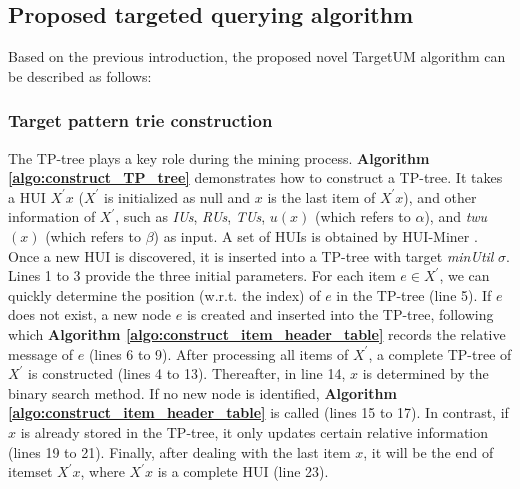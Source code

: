 \documentclass[journal]{IEEEtran}
\begin{document}
\subsection{Proposed targeted querying algorithm}

Based on the previous introduction, the proposed novel TargetUM algorithm can be described as follows:

\subsubsection{Target pattern trie construction}

The TP-tree plays a key role during the mining process. \textbf{Algorithm \ref{algo:construct_TP_tree}} demonstrates how to construct a TP-tree. It takes a HUI $X^\prime x$ ($X^\prime$ is initialized as null and $x$ is the last item of $X^\prime x$), and other information of $X^\prime$, such as \textit{IUs}, \textit{RUs}, \textit{TUs}, $u(x)$ (which refers to $\alpha$), and \textit{twu}$(x)$ (which refers to $\beta$) as input. A set of HUIs is obtained by HUI-Miner \cite{liu2012mining}. Once a new HUI is discovered, it is inserted into a TP-tree with target \textit{minUtil} $\sigma$. Lines 1 to 3 provide the three initial parameters. For each item $e \in X^\prime$, we can quickly determine the position (w.r.t. the index) of $e$ in the TP-tree (line 5). If $e$ does not exist, a new node $e$ is created and inserted into the TP-tree, following which \textbf{Algorithm \ref{algo:construct_item_header_table}} records the relative message of $e$ (lines 6 to 9). After processing all items of $X^\prime$, a complete TP-tree of $X^\prime$ is constructed (lines 4 to 13). Thereafter, in line 14, $x$ is determined by the binary search method. If no new node is identified, \textbf{Algorithm \ref{algo:construct_item_header_table}} is called (lines 15 to 17). In contrast, if $x$ is already stored in the TP-tree, it only updates certain relative information (lines 19 to 21). Finally, after dealing with the last item $x$, it will be the end of itemset $X^\prime x$, where $X^\prime x$ is a complete HUI (line 23).
\end{document}
